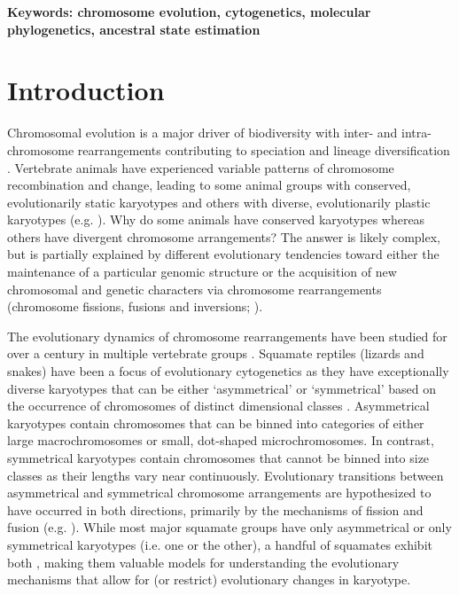 \documentclass[a4paper, 12pt]{article}
\begin{document}
\textbf{Keywords: chromosome evolution, cytogenetics, molecular phylogenetics, ancestral state estimation}


\section{Introduction}\label{main}

Chromosomal evolution is a major driver of biodiversity with inter- and intra-chromosome rearrangements contributing to speciation and lineage diversification \citep{pellestor2020chromoanagenesis}. 
Vertebrate animals have experienced variable patterns of chromosome recombination and change, leading to some animal groups with conserved, evolutionarily static karyotypes and others with diverse, evolutionarily plastic karyotypes (e.g. \citealt{graphodatsky2011genome,neto2011extensive,mezzasalma2019changes,degrandi2020distribution,mayrose2021evolution}).
Why do some animals have conserved karyotypes whereas others have divergent chromosome arrangements? 
The answer is likely complex, but is partially explained by different evolutionary tendencies toward either the maintenance of a particular genomic structure or the acquisition of new chromosomal and genetic characters via chromosome rearrangements (chromosome fissions, fusions and inversions; \citealt{crombach2007chromosome,amorim2021new}).

The evolutionary dynamics of chromosome rearrangements have been studied for over a century in multiple vertebrate groups \citep{damas2021vertebrate}. 
Squamate reptiles (lizards and snakes) have been a focus of evolutionary cytogenetics as they have exceptionally diverse karyotypes that can be either ‘asymmetrical’ or ‘symmetrical’ based on the occurrence of chromosomes of distinct dimensional classes \citep{stebbins1950chapter,white1973}. 
Asymmetrical karyotypes contain chromosomes that can be binned into categories of either large macrochromosomes or small, dot-shaped microchromosomes.
In contrast, symmetrical karyotypes contain chromosomes that cannot be binned into size classes as their lengths vary near continuously. 
Evolutionary transitions between asymmetrical and symmetrical chromosome arrangements are hypothesized to have occurred in both directions, primarily by the mechanisms of fission and fusion (e.g. \citealt{olmo2008trends,srikulnath2015karyotype}). 
While most major squamate groups have only asymmetrical or only symmetrical karyotypes (i.e. one or the other), a handful of squamates exhibit both \citep{mezzasalma2021lizards}, making them valuable models for understanding the evolutionary mechanisms that allow for (or restrict) evolutionary changes in karyotype.    
\end{document}
